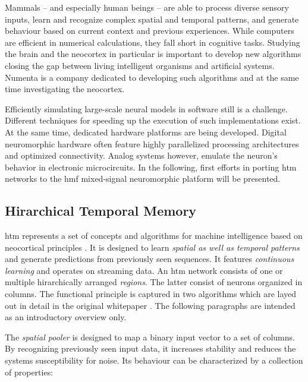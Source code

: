 Mammals -- and especially human beings -- are able to process diverse sensory inputs, learn and recognize complex spatial and temporal patterns, and generate behaviour based on current context and previous experiences. While computers are efficient in numerical calculations, they fall short in cognitive tasks. Studying the brain and the neocortex in particular is important to develop new algorithms closing the gap between living intelligent organisms and artificial systems. Numenta is a company dedicated to developing such algorithms and at the same time investigating the neocortex.

Efficiently simulating large-scale neural models in software still is a challenge. Different techniques for speeding up the execution of such implementations exist. At the same time, dedicated hardware platforms are being developed. Digital neuromorphic hardware often feature highly parallelized processing architectures and optimized connectivity. Analog systems however, emulate the neuron's behavior in electronic microcircuits. In the following, first efforts in porting \gls{htm} networks to the \gls{hmf} mixed-signal neuromorphic platform will be presented.


\subsection{Hirarchical Temporal Memory}

\gls{htm} represents a set of concepts and algorithms for machine intelligence based on neocortical principles \citep{numenta2011htm}. It is designed to learn \emph{spatial as well as temporal patterns} and generate predictions from previously seen sequences. It features \emph{continuous learning} and operates on streaming data. An \gls{htm} network consists of one or multiple hirarchically arranged \emph{regions}. The latter consist of neurons organized in columns. The functional principle is captured in two algorithms which are layed out in detail in the original whitepaper \citep{numenta2011htm}. The following paragraphs are intended as an introductory overview only.

\label{sec:spatial_pooler_properties}

The \emph{spatial pooler} is designed to map a binary input vector to a set of columns. By recognizing previously seen input data, it increases stability and reduces the systems susceptibility for noise. Its behaviour can be characterized by a collection of properties:

